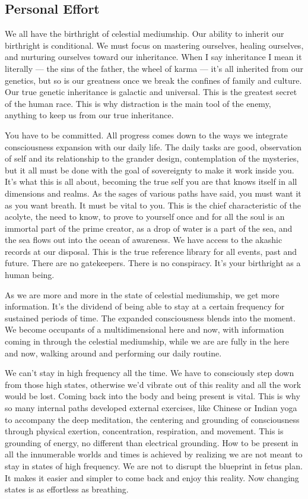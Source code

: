 \subsection{Personal Effort}\label{personal-effort}

We all have the birthright of celestial mediumship. Our ability to
inherit our birthright is conditional. We must focus on mastering
ourselves, healing ourselves, and nurturing ourselves toward our
inheritance. When I say inheritance I mean it literally --- the sins of
the father, the wheel of karma --- it's all inherited from our genetics,
but so is our greatness once we break the confines of family and
culture. Our true genetic inheritance is galactic and universal. This is
the greatest secret of the human race. This is why distraction is the
main tool of the enemy, anything to keep us from our true inheritance.

You have to be committed. All progress comes down to the ways we
integrate consciousness expansion with our daily life. The daily tasks
are good, observation of self and its relationship to the grander
design, contemplation of the mysteries, but it all must be done with the
goal of sovereignty to make it work inside you. It's what this is all
about, becoming the true self you are that knows itself in all
dimensions and realms. As the sages of various paths have said, you must
want it as you want breath. It must be vital to you. This is the chief
characteristic of the acolyte, the need to know, to prove to yourself
once and for all the soul is an immortal part of the prime creator, as a
drop of water is a part of the sea, and the sea flows out into the ocean
of awareness. We have access to the akashic records at our disposal.
This is the true reference library for all events, past and future.
There are no gatekeepers. There is no conspiracy. It's your birthright
as a human being.

As we are more and more in the state of celestial mediumship, we get
more information. It's the dividend of being able to stay at a certain
frequency for sustained periods of time. The expanded consciousness
blends into the moment. We become occupants of a multidimensional here
and now, with information coming in through the celestial mediumship,
while we are are fully in the here and now, walking around and
performing our daily routine.

We can't stay in high frequency all the time. We have to consciously
step down from those high states, otherwise we'd vibrate out of this
reality and all the work would be lost. Coming back into the body and
being present is vital. This is why so many internal paths developed
external exercises, like Chinese or Indian yoga to accompany the deep
meditation, the centering and grounding of consciousness through
physical exertion, concentration, respiration, and movement. This is
grounding of energy, no different than electrical grounding. How to be
present in all the innumerable worlds and times is achieved by realizing
we are not meant to stay in states of high frequency. We are not to
disrupt the blueprint in fetus plan. It makes it easier and simpler to
come back and enjoy this reality. Now changing states is as effortless
as breathing.

